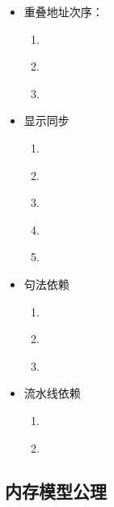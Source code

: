 \begin{itemize}
  \item 重叠地址次序： %
    \begin{enumerate}
      \item\label{ppo:->st} \ppost
      \item\label{ppo:rdw} \ppordw
      \item\label{ppo:amoforward} \ppoamoforward
    \end{enumerate}
  \item 显示同步  %
    \begin{enumerate}[resume]
      \item\label{ppo:fence} \ppofence
      \item\label{ppo:acquire} \ppoacquire
      \item\label{ppo:release} \pporelease
      \item\label{ppo:rcsc} \pporcsc
      \item\label{ppo:pair} \ppopair
    \end{enumerate}
  \item 句法依赖 %
    \begin{enumerate}[resume]
      \item\label{ppo:addr} \ppoaddr
      \item\label{ppo:data} \ppodata
      \item\label{ppo:ctrl} \ppoctrl
    \end{enumerate}
  \item 流水线依赖  %
    \begin{enumerate}[resume]
      \item\label{ppo:addrdatarfi} \ppoaddrdatarfi
      \item\label{ppo:addrpo} \ppoaddrpo
    \end{enumerate}
\end{itemize}

\subsection*{内存模型公理}

